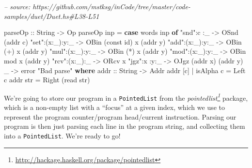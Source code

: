 \documentclass[]{article}
\newenvironment{Shaded}{}{}
\newcommand{\CommentTok}[1]{\textcolor[rgb]{0.38,0.63,0.69}{\textit{#1}}}
\newcommand{\DataTypeTok}[1]{\textcolor[rgb]{0.56,0.13,0.00}{#1}}
\newcommand{\FunctionTok}[1]{\textcolor[rgb]{0.02,0.16,0.49}{#1}}
\newcommand{\KeywordTok}[1]{\textcolor[rgb]{0.00,0.44,0.13}{\textbf{#1}}}
\newcommand{\NormalTok}[1]{#1}
\newcommand{\OtherTok}[1]{\textcolor[rgb]{0.00,0.44,0.13}{#1}}
\newcommand{\StringTok}[1]{\textcolor[rgb]{0.25,0.44,0.63}{#1}}
\renewcommand{\href}[2]{#2\footnote{\url{#1}}}
\begin{document}
\begin{Shaded}
\begin{Highlighting}[]
\CommentTok{-- source: https://github.com/mstksg/inCode/tree/master/code-samples/duet/Duet.hs#L38-L51}

\OtherTok{parseOp ::} \DataTypeTok{String} \OtherTok{->} \DataTypeTok{Op}
\NormalTok{parseOp inp }\FunctionTok{=} \KeywordTok{case}\NormalTok{ words inp }\KeywordTok{of}
    \StringTok{"snd"}\FunctionTok{:}\NormalTok{c    }\FunctionTok{:}\NormalTok{_   }\OtherTok{->} \DataTypeTok{OSnd}\NormalTok{ (addr c)}
    \StringTok{"set"}\FunctionTok{:}\NormalTok{(x}\FunctionTok{:}\NormalTok{_)}\FunctionTok{:}\NormalTok{y}\FunctionTok{:}\NormalTok{_ }\OtherTok{->} \DataTypeTok{OBin}\NormalTok{ (const id) x (addr y)}
    \StringTok{"add"}\FunctionTok{:}\NormalTok{(x}\FunctionTok{:}\NormalTok{_)}\FunctionTok{:}\NormalTok{y}\FunctionTok{:}\NormalTok{_ }\OtherTok{->} \DataTypeTok{OBin}\NormalTok{ (}\FunctionTok{+}\NormalTok{)        x (addr y)}
    \StringTok{"mul"}\FunctionTok{:}\NormalTok{(x}\FunctionTok{:}\NormalTok{_)}\FunctionTok{:}\NormalTok{y}\FunctionTok{:}\NormalTok{_ }\OtherTok{->} \DataTypeTok{OBin}\NormalTok{ (}\FunctionTok{*}\NormalTok{)        x (addr y)}
    \StringTok{"mod"}\FunctionTok{:}\NormalTok{(x}\FunctionTok{:}\NormalTok{_)}\FunctionTok{:}\NormalTok{y}\FunctionTok{:}\NormalTok{_ }\OtherTok{->} \DataTypeTok{OBin}\NormalTok{ mod        x (addr y)}
    \StringTok{"rcv"}\FunctionTok{:}\NormalTok{(x}\FunctionTok{:}\NormalTok{_)}\FunctionTok{:}\NormalTok{_   }\OtherTok{->} \DataTypeTok{ORcv}\NormalTok{ x}
    \StringTok{"jgz"}\FunctionTok{:}\NormalTok{x    }\FunctionTok{:}\NormalTok{y}\FunctionTok{:}\NormalTok{_ }\OtherTok{->} \DataTypeTok{OJgz}\NormalTok{ (addr x) (addr y)}
\NormalTok{    _               }\OtherTok{->}\NormalTok{ error }\StringTok{"Bad parse"}
  \KeywordTok{where}
\OtherTok{    addr ::} \DataTypeTok{String} \OtherTok{->} \DataTypeTok{Addr}
\NormalTok{    addr [c] }\FunctionTok{|}\NormalTok{ isAlpha c }\FunctionTok{=} \DataTypeTok{Left}\NormalTok{ c}
\NormalTok{    addr str }\FunctionTok{=} \DataTypeTok{Right}\NormalTok{ (read str)}
\end{Highlighting}
\end{Shaded}

We're going to store our program in a \texttt{PointedList} from the
\emph{\href{http://hackage.haskell.org/package/pointedlist}{pointedlist}}
package, which is a non-empty list with a ``focus'' at a given index, which we
use to represent the program counter/program head/current instruction. Parsing
our program is then just parsing each line in the program string, and collecting
them into a \texttt{PointedList}. We're ready to go!
\end{document}
